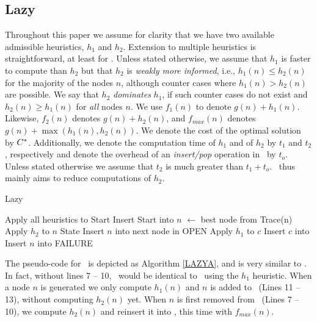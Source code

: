 \subsection{Lazy \astar}

Throughout this paper we assume for clarity that we have two available admissible heuristics, $h_1$ and $h_2$.
Extension to multiple heuristics is straightforward, at least for \lazyastar.
Unless stated otherwise, we assume that $h_1$ is faster to compute than $h_2$
but that $h_2$ is {\em weakly more informed}, i.e., $h_1(n) \leq h_2(n)$ for
the majority of the nodes $n$, although counter cases where $h_1(n) > h_2(n)$
are possible.
We say that $h_2$ {\em dominates} $h_1$, if such counter cases do not
exist and $h_2(n) \geq h_1(n)$ for {\em all} nodes $n$.
We use $f_1(n)$ to denote $g(n)+h_1(n)$. Likewise, $f_2(n)$
denotes $g(n)+h_2(n)$, and $f_{max}(n)$ denotes $g(n) + \max(h_1(n),h_2(n))$.
We denote the cost of the optimal solution by $C^\ast$. Additionally, we
denote the computation time of $h_1$ and of $h_2$ by $t_1$ and $t_2$,
respectively and denote the overhead of an {\em insert/pop} operation in
\OPEN~by $t_o$. Unless stated otherwise we assume that $t_2$ is much greater
than $t_1 + t_o$. \lazyastar~thus mainly aims to reduce computations of $h_2$.

\begin{algorithm}[h]
\caption{Lazy \astar}
\begin{algorithmic}[1]
    \State Apply all heuristics to Start
    \State Insert Start into \OPEN
        \State $n$ $\gets$ best node from \OPEN
            \Return Trace(n)
        \EndIf
            \State Apply $h_2$ to $n$
            State Insert $n$ into \OPEN
			 \Comment next node in OPEN
        \EndIf
            \State Apply $h_1$ to $c$
            \State Insert $c$ into \OPEN
        \EndFor
        \State Insert $n$ into \CLOSED
    \EndWhile
    \Return FAILURE
\EndProcedure
\end{algorithmic}
\label{LAZYA}
\end{algorithm}

The pseudo-code for  \lazyastar~is depicted as Algorithm \ref{LAZYA}, and is
very similar to \astar.
In fact, without lines 7 -- 10, \lazyastar~would be identical to
\astar~using the $h_1$ heuristic.
When a node $n$ is generated we only compute $h_1(n)$ and $n$ is added to
\OPEN ~(Lines 11 -- 13), without computing $h_2(n)$ yet.
When $n$ is first removed from \OPEN~(Lines 7 -- 10), we compute $h_2(n)$ and
reinsert it into \OPEN, this time with $f_{max}(n)$.%

